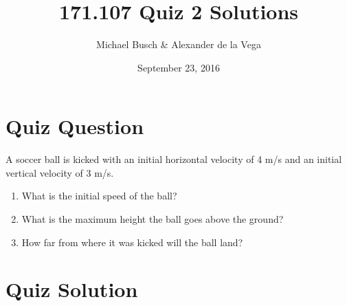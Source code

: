 \documentclass{article}[12pt]
\title{171.107 Quiz 2 Solutions}
\author{Michael Busch \& Alexander de la Vega}
\date{September 23, 2016}
\begin{document}
\maketitle


\section*{Quiz Question}
\begin{large} A soccer ball is kicked with an initial horizontal velocity of 4 m/s and an initial vertical velocity of 3 m/s.
\begin{enumerate}
\item What is the initial speed of the ball?
\item What is the maximum height the ball goes above the ground?
\item How far from where it was kicked will the ball land?
\end{enumerate}

\end{large}

\section*{Quiz Solution}
\end{document}
